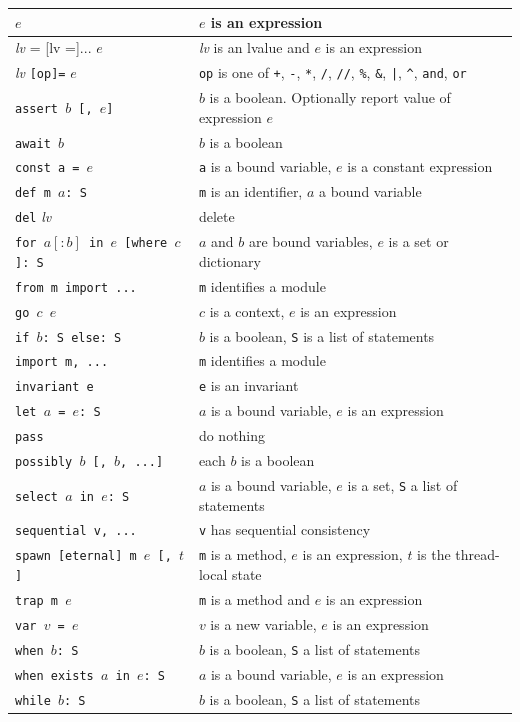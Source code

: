 \documentclass{report}
\begin{document}
\vspace{1em}
\begin{tabular}{|l|l|}
\hline
$e$ & $e$ is an expression\\
\hline
\textit{lv} = [lv =]... $e$ & \textit{lv} is an lvalue and $e$ is an expression\\
\hline
\textit{lv} \texttt{[op]=} $e$ & \texttt{op} is one of \texttt{+}, \texttt{-},
\texttt{*}, \texttt{/}, \texttt{//}, \texttt{\%},
\texttt{\&}, \texttt{|}, \texttt{\^},
\texttt{and}, \texttt{or}\\
\hline
\texttt{assert $b$ [, $e$]} & $b$ is a boolean.  Optionally report value of expression $e$\\
\hline
\texttt{await $b$} & $b$ is a boolean\\
\hline
\texttt{const a = $e$} & \texttt{a} is a bound variable, $e$ is a constant expression\\
\hline
\texttt{def m $a$: S} & \texttt{m} is an identifier, $a$ a bound variable\\
\hline
\texttt{del} \textit{lv} & delete\\
\hline
\texttt{for $a[:b]$ in $e$ [where $c$]: S} & $a$ and $b$ are bound variables, $e$ is a set or dictionary \\
\hline
\texttt{from m import ...} & \texttt{m} identifies a module \\
\hline
\texttt{go $c$ $e$} & $c$ is a context, $e$ is an expression \\
\hline
\texttt{if $b$: S else: S} & $b$ is a boolean, \texttt{S} is a list of statements\\
\hline
\texttt{import m, ...} & \texttt{m} identifies a module \\
\hline
\texttt{invariant e} & \texttt{e} is an invariant\\
\hline
\texttt{let $a$ = $e$: S} & $a$ is a bound variable, $e$ is an expression\\
\hline
\texttt{pass} & do nothing\\
\hline
\texttt{possibly $b$ [, $b$, ...]} & each $b$ is a boolean \\
\hline
\texttt{select $a$ in $e$: S} & $a$ is a bound variable, $e$ is a set,
                            \texttt{S} a list of statements\\
\hline
\texttt{sequential v, ...} & \texttt{v} has sequential consistency \\
\hline
\texttt{spawn [eternal] m $e$ [, $t$]} & \texttt{m} is a method,
$e$ is an expression, $t$ is the thread-local state \\
\hline
\texttt{trap m $e$} & \texttt{m} is a method and $e$ is an expression \\
\hline
\texttt{var $v$ = $e$} & $v$ is a new variable, $e$ is an expression\\
\hline
\texttt{when $b$: S} & $b$ is a boolean, \texttt{S} a list of statements\\
\hline
\texttt{when exists $a$ in $e$: S} & $a$ is a bound variable, $e$ is an expression\\
\hline
\texttt{while $b$: S} & $b$ is a boolean, \texttt{S} a list of statements\\
\hline
\end{tabular}
\end{document}
